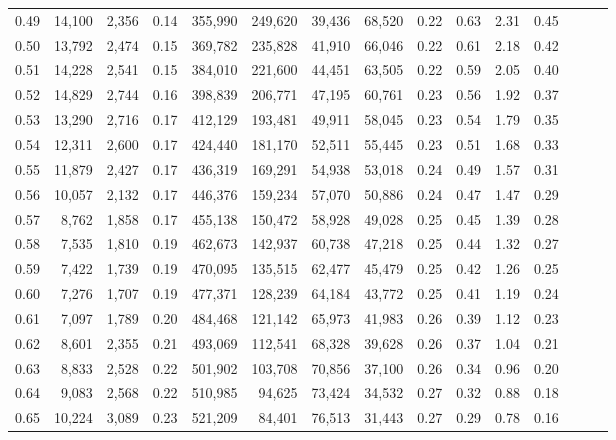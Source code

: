 \begin{tabular}{rrrrrrrrrrrrrrr}
0.49 &  14,100 &  2,356 &  0.14 &  355,990 &  249,620 &   39,436 &   68,520 &  0.22 &  0.63 &  2.31 &      0.45 \\
0.50 &  13,792 &  2,474 &  0.15 &  369,782 &  235,828 &   41,910 &   66,046 &  0.22 &  0.61 &  2.18 &      0.42 \\
0.51 &  14,228 &  2,541 &  0.15 &  384,010 &  221,600 &   44,451 &   63,505 &  0.22 &  0.59 &  2.05 &      0.40 \\
0.52 &  14,829 &  2,744 &  0.16 &  398,839 &  206,771 &   47,195 &   60,761 &  0.23 &  0.56 &  1.92 &      0.37 \\
0.53 &  13,290 &  2,716 &  0.17 &  412,129 &  193,481 &   49,911 &   58,045 &  0.23 &  0.54 &  1.79 &      0.35 \\
0.54 &  12,311 &  2,600 &  0.17 &  424,440 &  181,170 &   52,511 &   55,445 &  0.23 &  0.51 &  1.68 &      0.33 \\
0.55 &  11,879 &  2,427 &  0.17 &  436,319 &  169,291 &   54,938 &   53,018 &  0.24 &  0.49 &  1.57 &      0.31 \\
0.56 &  10,057 &  2,132 &  0.17 &  446,376 &  159,234 &   57,070 &   50,886 &  0.24 &  0.47 &  1.47 &      0.29 \\
0.57 &   8,762 &  1,858 &  0.17 &  455,138 &  150,472 &   58,928 &   49,028 &  0.25 &  0.45 &  1.39 &      0.28 \\
0.58 &   7,535 &  1,810 &  0.19 &  462,673 &  142,937 &   60,738 &   47,218 &  0.25 &  0.44 &  1.32 &      0.27 \\
0.59 &   7,422 &  1,739 &  0.19 &  470,095 &  135,515 &   62,477 &   45,479 &  0.25 &  0.42 &  1.26 &      0.25 \\
0.60 &   7,276 &  1,707 &  0.19 &  477,371 &  128,239 &   64,184 &   43,772 &  0.25 &  0.41 &  1.19 &      0.24 \\
0.61 &   7,097 &  1,789 &  0.20 &  484,468 &  121,142 &   65,973 &   41,983 &  0.26 &  0.39 &  1.12 &      0.23 \\
0.62 &   8,601 &  2,355 &  0.21 &  493,069 &  112,541 &   68,328 &   39,628 &  0.26 &  0.37 &  1.04 &      0.21 \\
0.63 &   8,833 &  2,528 &  0.22 &  501,902 &  103,708 &   70,856 &   37,100 &  0.26 &  0.34 &  0.96 &      0.20 \\
0.64 &   9,083 &  2,568 &  0.22 &  510,985 &   94,625 &   73,424 &   34,532 &  0.27 &  0.32 &  0.88 &      0.18 \\
0.65 &  10,224 &  3,089 &  0.23 &  521,209 &   84,401 &   76,513 &   31,443 &  0.27 &  0.29 &  0.78 &      0.16 \\

\end{tabular}
